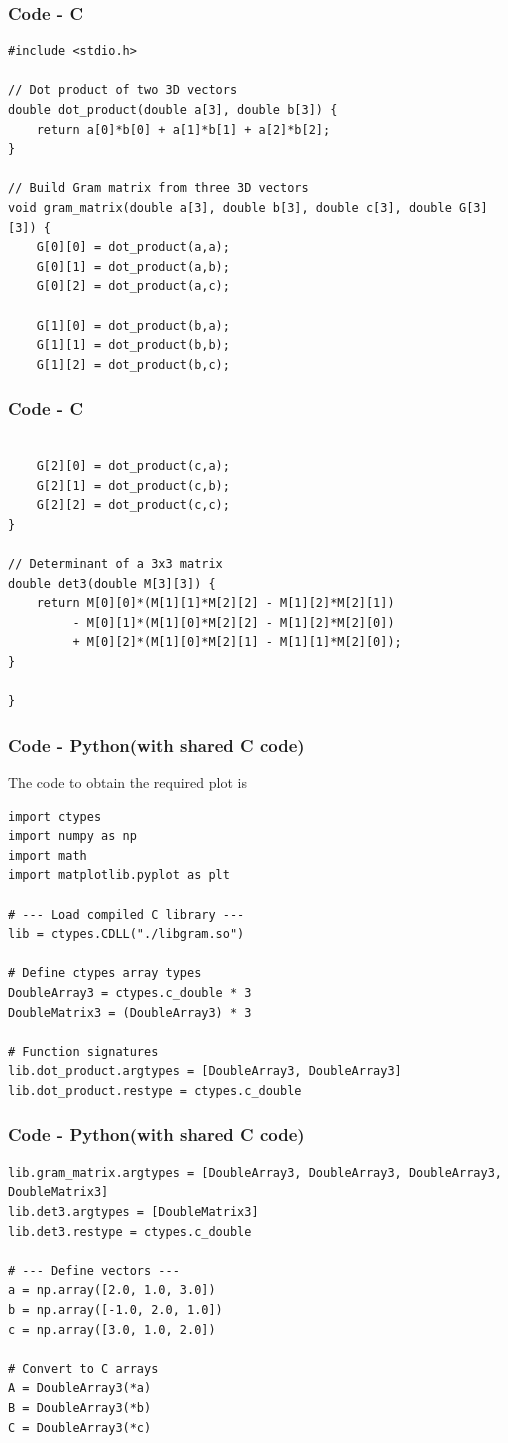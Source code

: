 \documentclass{beamer}
\theoremstyle{remark}
\numberwithin{equation}{section}
\begin{document}
\begin{frame}[fragile]
    \frametitle{Code - C}
    \begin{lstlisting}
#include <stdio.h>

// Dot product of two 3D vectors
double dot_product(double a[3], double b[3]) {
    return a[0]*b[0] + a[1]*b[1] + a[2]*b[2];
}

// Build Gram matrix from three 3D vectors
void gram_matrix(double a[3], double b[3], double c[3], double G[3][3]) {
    G[0][0] = dot_product(a,a);
    G[0][1] = dot_product(a,b);
    G[0][2] = dot_product(a,c);

    G[1][0] = dot_product(b,a);
    G[1][1] = dot_product(b,b);
    G[1][2] = dot_product(b,c);
    \end{lstlisting}
    \end{frame}

    \begin{frame}[fragile]
    \frametitle{Code - C}
    \begin{lstlisting}

    G[2][0] = dot_product(c,a);
    G[2][1] = dot_product(c,b);
    G[2][2] = dot_product(c,c);
}

// Determinant of a 3x3 matrix
double det3(double M[3][3]) {
    return M[0][0]*(M[1][1]*M[2][2] - M[1][2]*M[2][1])
         - M[0][1]*(M[1][0]*M[2][2] - M[1][2]*M[2][0])
         + M[0][2]*(M[1][0]*M[2][1] - M[1][1]*M[2][0]);
}

}

\end{lstlisting}
\end{frame}

\begin{frame}[fragile]
    \frametitle{Code - Python(with shared C code)}
    The code to obtain the required plot is
    \begin{lstlisting}
import ctypes
import numpy as np
import math
import matplotlib.pyplot as plt

# --- Load compiled C library ---
lib = ctypes.CDLL("./libgram.so")

# Define ctypes array types
DoubleArray3 = ctypes.c_double * 3
DoubleMatrix3 = (DoubleArray3) * 3

# Function signatures
lib.dot_product.argtypes = [DoubleArray3, DoubleArray3]
lib.dot_product.restype = ctypes.c_double

\end{lstlisting}
\end{frame}
\begin{frame}[fragile]
\frametitle{Code - Python(with shared C code)}
\begin{lstlisting}
lib.gram_matrix.argtypes = [DoubleArray3, DoubleArray3, DoubleArray3, DoubleMatrix3]
lib.det3.argtypes = [DoubleMatrix3]
lib.det3.restype = ctypes.c_double

# --- Define vectors ---
a = np.array([2.0, 1.0, 3.0])
b = np.array([-1.0, 2.0, 1.0])
c = np.array([3.0, 1.0, 2.0])

# Convert to C arrays
A = DoubleArray3(*a)
B = DoubleArray3(*b)
C = DoubleArray3(*c)

\end{lstlisting}
\end{frame}
\end{document}
